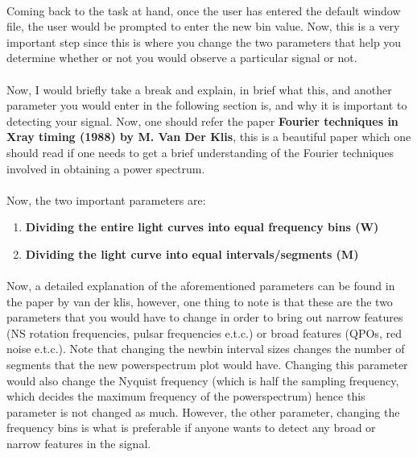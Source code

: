 \documentclass[a4paper,twoside]{report}
\numberwithin{equation}{section}
\begin{document}
\paragraph{}
Coming back to the task at hand, once the user has entered the default window file, the user would be prompted to enter the new bin value. Now, this is a very important step since this is where you change the two parameters that help you determine whether or not you would observe a particular signal or not. 
\paragraph{}
Now, I would briefly take a break and explain, in brief what this, and another parameter you would enter in the following section is, and why it is important to detecting your signal. Now, one should refer the paper \textbf{Fourier techniques in Xray timing (1988) by M. Van Der Klis}, this is a beautiful paper which one should read if one needs to get a brief understanding of the Fourier techniques involved in obtaining a  power spectrum. 
\paragraph{}
Now, the two important parameters are:
\begin{enumerate}
\item \textbf{Dividing the entire light curves into equal frequency bins (W)}
\item \textbf{Dividing the light curve into equal intervals/segments (M)}
\end{enumerate}
\paragraph{}
Now, a detailed explanation of the aforementioned parameters can be found in the paper by van der klis, however, one thing to note is that these are the two parameters that you would have to change in order to bring out narrow features (NS rotation frequencies, pulsar frequencies e.t.c.) or broad features (QPOs, red noise e.t.c.). Note that changing the newbin interval sizes changes the number of segments that the new powerspectrum plot would have. Changing this parameter would also change the Nyquist frequency (which is half the sampling frequency, which decides the maximum frequency of the powerspectrum) hence this parameter is not changed as much. However, the other parameter, changing the frequency bins is what is preferable if anyone wants to detect any broad or narrow features in the signal.
\end{document}
